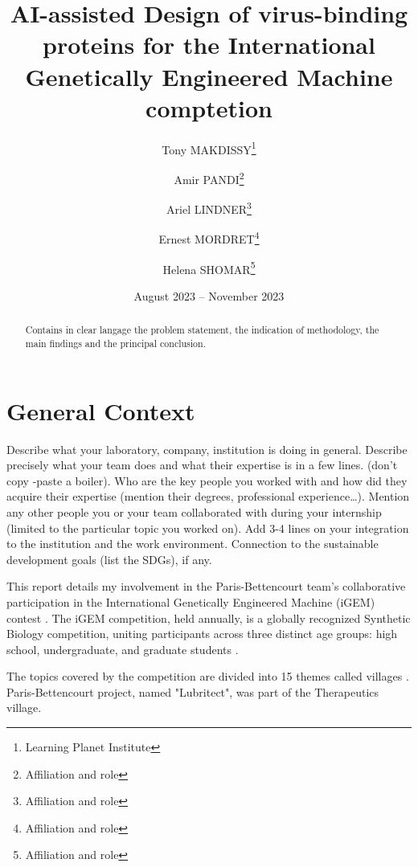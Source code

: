 \documentclass[11pt,a4paper]{article}
\begin{document}
\title{AI-assisted Design of virus-binding proteins for the International Genetically Engineered Machine comptetion}
\author{Tony MAKDISSY\thanks{Learning Planet Institute} \and 
Amir PANDI\thanks{Affiliation and role} \and 
Ariel LINDNER\thanks{Affiliation and role} \and
Ernest MORDRET\thanks{Affiliation and role} \and
Helena SHOMAR\thanks{Affiliation and role}}




\date{August 2023 -- November 2023}
\maketitle

\begin{abstract}
    \begin{displayquote}
        Contains in clear langage the problem statement, the indication of methodology, the main findings and the principal conclusion.
    \end{displayquote}  
\end{abstract}

\section*{General Context}
\begin{displayquote}
    Describe what your laboratory, company, institution is doing in general. 
Describe precisely what your team does and what their expertise is in a few lines. (don’t copy -paste a boiler).
Who are the key people you worked with and how did they acquire their expertise (mention their degrees, professional experience…). Mention any other people you or your team collaborated with during your internship (limited to the particular topic you worked on). 
Add 3-4 lines on your integration to the institution and the work environment.
Connection to the sustainable development goals (list the SDGs), if any.
\end{displayquote}

This report details my involvement in the Paris-Bettencourt team's 
collaborative participation in the International Genetically Engineered 
Machine (iGEM) contest \cite{igem_main}. The iGEM competition, held annually, 
is a globally recognized Synthetic Biology competition, uniting 
participants across three distinct age groups: high school, undergraduate, 
and graduate students \cite{igem_description}.

The topics covered by the competition are divided into 15 themes called villages \cite{igem_villages}.
Paris-Bettencourt project, named "Lubritect", was part of the Therapeutics village.
\end{document}
